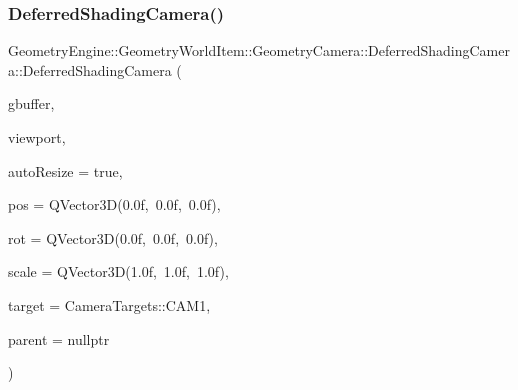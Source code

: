 \subsubsection{\texorpdfstring{DeferredShadingCamera()}{DeferredShadingCamera()}\hspace{0.1cm}{\footnotesize\ttfamily [1/2]}}
{\footnotesize\ttfamily Geometry\+Engine\+::\+Geometry\+World\+Item\+::\+Geometry\+Camera\+::\+Deferred\+Shading\+Camera\+::\+Deferred\+Shading\+Camera (\begin{DoxyParamCaption}\item[{const \mbox{\hyperlink{class_geometry_engine_1_1_geometry_render_data_1_1_render_buffers_data}{Geometry\+Render\+Data\+::\+Render\+Buffers\+Data}} \&}]{gbuffer,  }\item[{const \mbox{\hyperlink{class_geometry_engine_1_1_geometry_item_utils_1_1_viewport}{Geometry\+Item\+Utils\+::\+Viewport}} \&}]{viewport,  }\item[{bool}]{auto\+Resize = {\ttfamily true},  }\item[{const Q\+Vector3D \&}]{pos = {\ttfamily QVector3D(0.0f,~0.0f,~0.0f)},  }\item[{const Q\+Vector3D \&}]{rot = {\ttfamily QVector3D(0.0f,~0.0f,~0.0f)},  }\item[{const Q\+Vector3D \&}]{scale = {\ttfamily QVector3D(1.0f,~1.0f,~1.0f)},  }\item[{const \mbox{\hyperlink{namespace_geometry_engine_1_1_geometry_world_item_1_1_geometry_camera_a3766848bae97ff8203fa26907ac359ef}{Camera\+Targets}} \&}]{target = {\ttfamily CameraTargets\+:\+:CAM1},  }\item[{\mbox{\hyperlink{class_geometry_engine_1_1_geometry_world_item_1_1_world_item}{World\+Item}} $\ast$}]{parent = {\ttfamily nullptr} }\end{DoxyParamCaption})}

